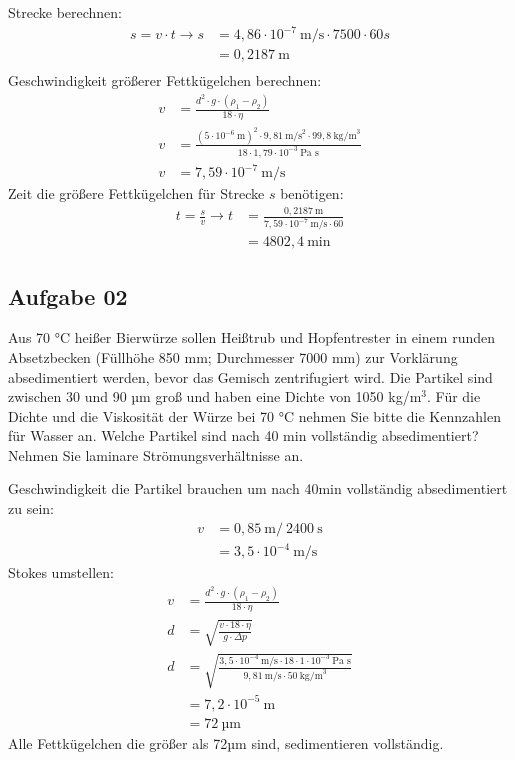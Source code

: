 \documentclass[a4paper,10pt]{article}
\begin{document}
Strecke berechnen:
\begin{align*}
s = v \cdot t \rightarrow s &= 4,86 \cdot 10^{-7} ~\text{m/s} \cdot 7500 \cdot 60s \\
 &= 0,2187 ~\text{m} \\
\end{align*}
Geschwindigkeit größerer Fettkügelchen berechnen: 
\begin{align*}
v &= \frac{d^2 \cdot g \cdot (\rho_1 - \rho_2)}{18 \cdot \eta} \\
v &= \frac{(5 \cdot 10^{-6} ~\text{m})^2 \cdot 9,81 ~\text{m/s}^2 \cdot 99,8 ~\text{kg/m}^3}{18 \cdot 1,79 \cdot 10^{-3} ~\text{Pa s}} \\
v &= 7,59 \cdot 10^{-7} ~\text{m/s}
\end{align*}
Zeit die größere Fettkügelchen für Strecke $s$ benötigen:
\begin{align*}
t = \frac{s}{v} \rightarrow t &= \frac{0,2187 ~\text{m}}{7,59 \cdot 10^{-7} ~\text{m/s} \cdot 60} \\
&= 4802,4 ~\text{min}
\end{align*}


\pagebreak
\subsection*{Aufgabe 02}
Aus 70 °C heißer Bierwürze sollen Heißtrub und Hopfentrester in einem runden Absetzbecken
(Füllhöhe 850 mm; Durchmesser 7000 mm) zur Vorklärung absedimentiert werden, bevor das
Gemisch zentrifugiert wird. Die Partikel sind zwischen 30 und 90 µm groß und haben eine
Dichte von 1050 kg/m$^3$. Für die Dichte und die Viskosität der Würze bei 70 °C nehmen Sie
bitte die Kennzahlen für Wasser an. Welche Partikel sind nach 40 min vollständig
absedimentiert? Nehmen Sie laminare Strömungsverhältnisse an.



Geschwindigkeit die Partikel brauchen um nach 40min vollständig absedimentiert zu sein:
\begin{align*}
v &= 0,85~\text{m} / ~2400~\text{s} \\
&= 3,5 \cdot 10^{-4} ~\text{m/s}
\end{align*}
Stokes umstellen:
\begin{align*}
v &= \frac{d^2 \cdot g \cdot (\rho_1 - \rho_2)}{18 \cdot \eta} \\
d &= \sqrt{\frac{v \cdot 18 \cdot \eta}{g \cdot \Delta p}} \\
d &= \sqrt{\frac{3,5 \cdot 10^{-4} ~\text{m/s} \cdot 18 \cdot 1 \cdot 10^{-3} ~\text{Pa s}}{9,81 ~\text{m/s} \cdot 50 ~\text{kg/m}^3}} \\
 &= 7,2 \cdot 10^{-5} ~\text{m} \\
 &= 72 ~\text{µm}
\end{align*}
Alle Fettkügelchen die größer als 72µm sind, sedimentieren vollständig.
\end{document}
